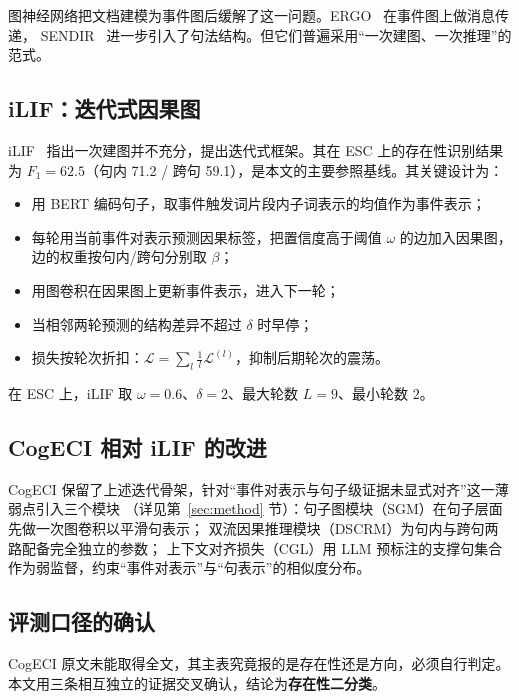 图神经网络把文档建模为事件图后缓解了这一问题。ERGO~\cite{ergo} 在事件图上做消息传递，
SENDIR~\cite{sendir} 进一步引入了句法结构。但它们普遍采用“一次建图、一次推理”的范式。

\subsection{iLIF：迭代式因果图}

iLIF~\cite{ilif} 指出一次建图并不充分，提出迭代式框架。其在 ESC 上的存在性识别结果为
$F_1=62.5$（句内 71.2 / 跨句 59.1），是本文的主要参照基线。其关键设计为：

\begin{itemize}
  \item 用 BERT 编码句子，取事件触发词片段内子词表示的均值作为事件表示；
  \item 每轮用当前事件对表示预测因果标签，把置信度高于阈值 $\omega$ 的边加入因果图，
        边的权重按句内/跨句分别取 $\beta$；
  \item 用图卷积在因果图上更新事件表示，进入下一轮；
  \item 当相邻两轮预测的结构差异不超过 $\delta$ 时早停；
  \item 损失按轮次折扣：$\mathcal{L}=\sum_{l}\frac{1}{l}\mathcal{L}^{(l)}$，抑制后期轮次的震荡。
\end{itemize}

在 ESC 上，iLIF 取 $\omega=0.6$、$\delta=2$、最大轮数 $L=9$、最小轮数 $2$。

\subsection{CogECI 相对 iLIF 的改进}

CogECI 保留了上述迭代骨架，针对“事件对表示与句子级证据未显式对齐”这一薄弱点引入三个模块
（详见第~\ref{sec:method} 节）：句子图模块（SGM）在句子层面先做一次图卷积以平滑句表示；
双流因果推理模块（DSCRM）为句内与跨句两路配备完全独立的参数；
上下文对齐损失（CGL）用 LLM 预标注的支撑句集合作为弱监督，约束“事件对表示”与“句表示”的相似度分布。

\subsection{评测口径的确认}
\label{sec:protocol}

CogECI 原文未能取得全文，其主表究竟报的是存在性还是方向，必须自行判定。
本文用三条相互独立的证据交叉确认，结论为\textbf{存在性二分类}。

